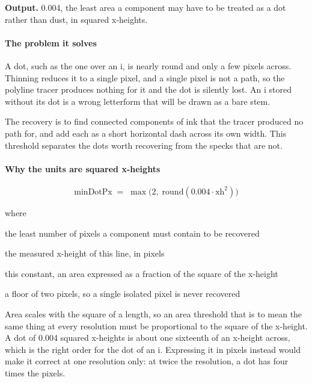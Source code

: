 \noindent\textbf{Output.} 0.004, the least area a component may have to be treated as a dot rather than dust, in squared x-heights.


\paragraph{The problem it solves}
A dot, such as the one over an i, is nearly round and only a few pixels across. Thinning reduces it to a single pixel, and a single pixel is not a path, so the polyline tracer produces nothing for it and the dot is silently lost. An i stored without its dot is a wrong letterform that will be drawn as a bare stem.

The recovery is to find connected components of ink that the tracer produced no path for, and add each as a short horizontal dash across its own width. This threshold separates the dots worth recovering from the specks that are not.


\paragraph{Why the units are squared x-heights}

\begin{equation}
\mathrm{minDotPx} \;=\; \max\!\big(2,\; \mathrm{round}(0.004 \cdot \mathrm{xh}^{2})\big)
\end{equation}

\noindent where
\begin{description}[leftmargin=2.4em,style=nextline,font=\normalfont\ttfamily]\setlength\itemsep{1pt}
  \item[{$\mathrm{minDotPx}$}] \normalfont the least number of pixels a component must contain to be recovered
  \item[{$\mathrm{xh}$}] \normalfont the measured x-height of this line, in pixels
  \item[{$0.004$}] \normalfont this constant, an area expressed as a fraction of the square of the x-height
  \item[{$\max(2,\cdot)$}] \normalfont a floor of two pixels, so a single isolated pixel is never recovered
\end{description}
Area scales with the square of a length, so an area threshold that is to mean the same thing at every resolution must be proportional to the square of the x-height. A dot of 0.004 squared x-heights is about one sixteenth of an x-height across, which is the right order for the dot of an i. Expressing it in pixels instead would make it correct at one resolution only: at twice the resolution, a dot has four times the pixels.


